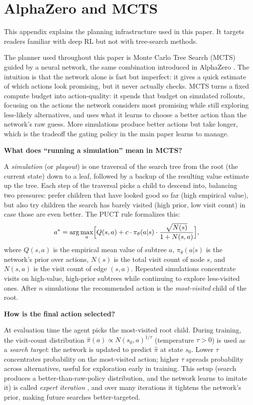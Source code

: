 \documentclass{article}
\begin{document}
\section{AlphaZero and MCTS}
\label{app:az_primer}

This appendix explains the planning infrastructure used in this paper.
It targets readers familiar with deep RL but not with tree-search
methods.

The planner used throughout this paper is Monte Carlo Tree Search
(MCTS) guided by a neural network, the same combination introduced
in AlphaZero \citep{silver2018general}. The intuition is that the
network alone is fast but imperfect: it gives a quick estimate of which
actions look promising, but it never actually checks. MCTS turns a
fixed compute budget into action-quality: it spends that budget on
simulated rollouts, focusing on the actions the network considers most
promising while still exploring less-likely alternatives, and uses what
it learns to choose a better action than the network's raw guess. More
simulations produce better actions but take longer, which is the
tradeoff the gating policy in the main paper learns to manage.

\textbf{What does ``running a simulation'' mean in MCTS?}

A \emph{simulation} (or \emph{playout}) is one traversal of the search
tree from the root (the current state) down to a leaf, followed by a
backup of the resulting value estimate up the tree. Each step of the
traversal picks a child to descend into, balancing two pressures:
prefer children that have looked good so far (high empirical value),
but also try children the search has barely visited (high prior, low
visit count) in case those are even better. The PUCT rule formalizes
this:
\[
  a^* = \arg\max_a \Bigl[Q(s,a)
        + c \cdot \pi_\theta(a|s)
          \cdot \frac{\sqrt{N(s)}}{1+N(s,a)}\Bigr],
\]
where $Q(s,a)$ is the empirical mean value of subtree $a$,
$\pi_\theta(a|s)$ is the network's prior over actions,
$N(s)$ is the total visit count of node $s$,
and $N(s,a)$ is the visit count of edge $(s,a)$.
Repeated simulations concentrate visits on high-value, high-prior
subtrees while continuing to explore less-visited ones.
After $n$ simulations the recommended action is the
\emph{most-visited} child of the root.

\textbf{How is the final action selected?}

At evaluation time the agent picks the most-visited root child.
During training, the visit-count distribution
$\hat{\pi}(a) \propto N(s_0,a)^{1/\tau}$ (temperature $\tau > 0$)
is used as a \emph{search target}: the network is updated to predict
$\hat{\pi}$ at state $s_0$. Lower $\tau$ concentrates probability on
the most-visited action; higher $\tau$ spreads probability across
alternatives, useful for exploration early in training.
This setup (search produces a better-than-raw-policy distribution,
and the network learns to imitate it) is called \emph{expert
iteration} \citep{anthony2021expert}, and over many iterations it tightens the network's prior,
making future searches better-targeted.
\end{document}
